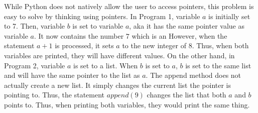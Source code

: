 \documentclass{article}
\begin{document}
While Python does not natively allow the user to access pointers, this problem is easy to solve by thinking using pointers. In Program 1, variable $a$ is initially set to 7. Then, variable $b$ is set to variable $a$, aka it has the same pointer value as variable $a$. It now contains the number $7$ which is an  However, when the statement $a+1$ is processed, it sets $a$ to the new integer of $8$. Thus, when both variables are printed, they will have different values. On the other hand, in Program 2, variable $a$ is set to a list. When $b$ is set to $a$, $b$ is set to the same list and will have the same pointer to the list as $a$. The append method does not actually create a new list. It simply changes the current list the pointer is pointing to. Thus, the statement $append(9)$ changes the list that both $a$ and $b$ points to. Thus, when printing both variables, they would print the same thing. 
\end{document}
